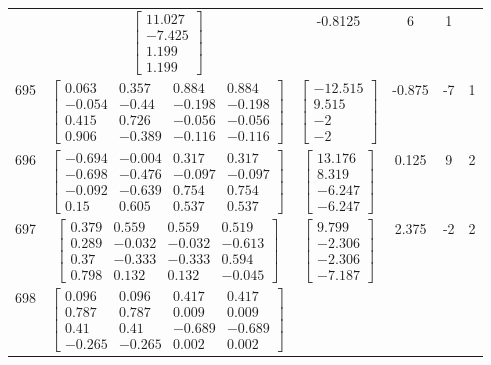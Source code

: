 \documentclass[a4paper,12pt]{article}
\begin{document}
\begin{tabular}{c c c c c c}
&
$\begin{bmatrix} 11.027 \\ -7.425 \\ 1.199 \\ 1.199 \end{bmatrix}$
&
-0.8125
&
6
&
1
\\
695
&
$\begin{bmatrix} 0.063 & 0.357 & 0.884 & 0.884 \\ -0.054 & -0.44 & -0.198 & -0.198 \\ 0.415 & 0.726 & -0.056 & -0.056 \\ 0.906 & -0.389 & -0.116 & -0.116 \end{bmatrix}$
&
$\begin{bmatrix} -12.515 \\ 9.515 \\ -2 \\ -2 \end{bmatrix}$
&
-0.875
&
-7
&
1
\\
696
&
$\begin{bmatrix} -0.694 & -0.004 & 0.317 & 0.317 \\ -0.698 & -0.476 & -0.097 & -0.097 \\ -0.092 & -0.639 & 0.754 & 0.754 \\ 0.15 & 0.605 & 0.537 & 0.537 \end{bmatrix}$
&
$\begin{bmatrix} 13.176 \\ 8.319 \\ -6.247 \\ -6.247 \end{bmatrix}$
&
0.125
&
9
&
2
\\
697
&
$\begin{bmatrix} 0.379 & 0.559 & 0.559 & 0.519 \\ 0.289 & -0.032 & -0.032 & -0.613 \\ 0.37 & -0.333 & -0.333 & 0.594 \\ 0.798 & 0.132 & 0.132 & -0.045 \end{bmatrix}$
&
$\begin{bmatrix} 9.799 \\ -2.306 \\ -2.306 \\ -7.187 \end{bmatrix}$
&
2.375
&
-2
&
2
\\
698
&
$\begin{bmatrix} 0.096 & 0.096 & 0.417 & 0.417 \\ 0.787 & 0.787 & 0.009 & 0.009 \\ 0.41 & 0.41 & -0.689 & -0.689 \\ -0.265 & -0.265 & 0.002 & 0.002 \end{bmatrix}$

\end{tabular}
\end{document}
